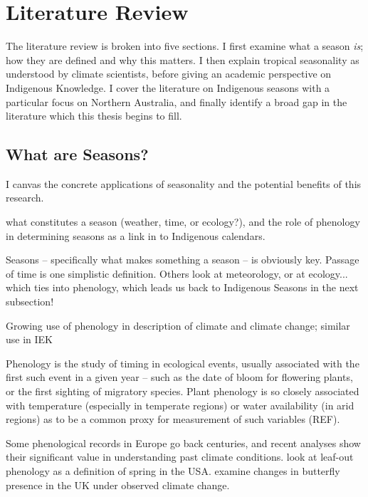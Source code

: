 \chapter{Literature Review}
\label{ch:lit-review}

The literature review is broken into five sections.  I first examine
what a season \emph{is}; how they are defined and why this matters.
I then explain tropical seasonality as understood by climate scientists,
before giving an academic perspective on Indigenous Knowledge.
I cover the literature on Indigenous seasons with a particular
focus on Northern Australia, and finally identify a broad gap in the
literature which this thesis begins to fill.



\section{What are Seasons?}


I canvas the concrete applications of
seasonality and the potential benefits of this research.

what constitutes a season (weather, time, or ecology?),
and the role of phenology in determining seasons as a link in to Indigenous
calendars.

Seasons – specifically what makes something a season – is obviously key.
Passage of time is one simplistic definition.  Others look at meteorology, or
at ecology... which ties into phenology, which leads us back to Indigenous
Seasons in the next subsection!


Growing use of phenology in description of climate and climate change; similar
use in IEK

Phenology is the study of timing in ecological events, usually associated with
the first such event in a given year – such as the date of bloom for flowering
plants, or the first sighting of migratory species.  Plant phenology is so
closely associated with temperature (especially in temperate regions) or water
availability (in arid regions) as to be a common proxy for measurement of such
variables (REF).

Some phenological records in Europe go back centuries, and recent analyses show
their significant value in understanding past climate conditions.
\citet{allstadt2015} look at leaf-out phenology as a definition of spring
in the USA.  \citet{menzel2006} examine changes in butterfly presence in the
UK under observed climate change.




